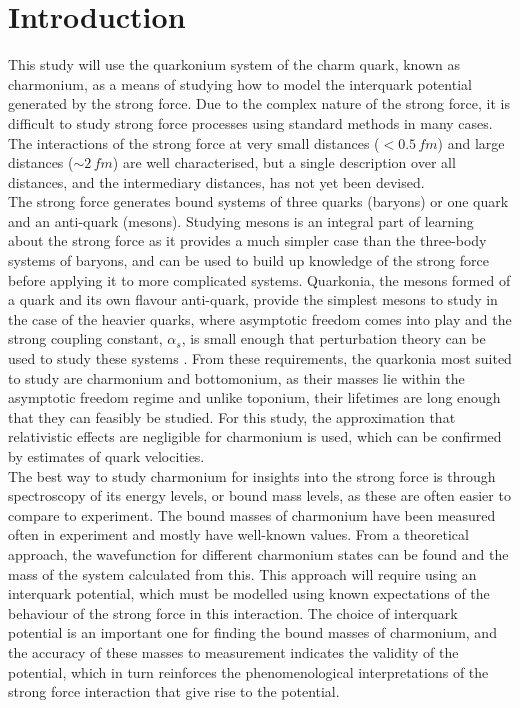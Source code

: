 \documentclass[10pt, twocolumn]{article}
\begin{document}
\section{Introduction}
This study will use the quarkonium system of the charm quark, known as charmonium, as a means of studying how to model the interquark potential generated by the strong force.
Due to the complex nature of the strong force, it is difficult to study strong force processes using standard methods in many cases. 
The interactions of the strong force at very small distances ($<0.5\,fm$) and large distances ($\sim2\,fm$) are well characterised, but a single description over all distances, and the intermediary distances, has not yet been devised. \\
The strong force generates bound systems of three quarks (baryons) or one quark and an anti-quark (mesons). 
Studying mesons is an integral part of learning about the strong force as it provides a much simpler case than the three-body systems of baryons, and can be used to build up knowledge of the strong force before applying it to more complicated systems. 
Quarkonia, the mesons formed of a quark and its own flavour anti-quark, provide the simplest mesons to study in the case of the heavier quarks, where asymptotic freedom comes into play and the strong coupling constant, $\alpha_s$, is small enough that perturbation theory can be used to study these systems \cite{3}.
From these requirements, the quarkonia most suited to study are charmonium and bottomonium, as their masses lie within the asymptotic freedom regime and unlike toponium, their lifetimes are long enough that they can feasibly be studied.
For this study, the approximation that relativistic effects are negligible for charmonium is used, which can be confirmed by estimates of quark velocities. \\
The best way to study charmonium for insights into the strong force is through spectroscopy of its energy levels, or bound mass levels, as these are often easier to compare to experiment. 
The bound masses of charmonium have been measured often in experiment and mostly have well-known values. 
From a theoretical approach, the wavefunction for different charmonium states can be found and the mass of the system calculated from this. 
This approach will require using an interquark potential, which must be modelled using known expectations of the behaviour of the strong force in this interaction. 
The choice of interquark potential is an important one for finding the bound masses of charmonium, and the accuracy of these masses to measurement indicates the validity of the potential, which in turn reinforces the phenomenological interpretations of the strong force interaction that give rise to the potential.
\end{document}
